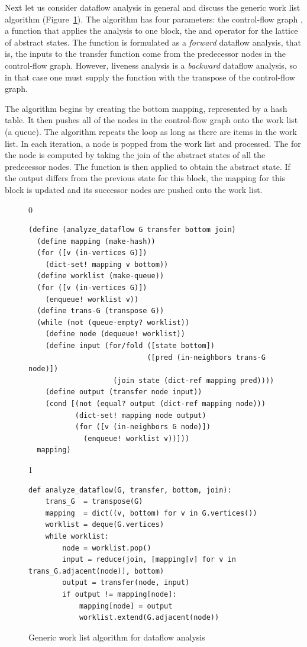 \documentclass[7x10,nocrop]{TimesAPriori_MIT}%
\def\racketEd{0}
\def\pythonEd{1}
\def\edition{1}
\begin{document}
Next let us consider dataflow analysis in general and discuss the
generic work list algorithm (Figure~\ref{fig:generic-dataflow}). 
%
The algorithm has four parameters: the control-flow graph , a
function  that applies the analysis to one block, the
 and  operator for the lattice of abstract
states. The  function is formulated as a
\emph{forward} dataflow analysis, that is, the inputs to the transfer
function come from the predecessor nodes in the control-flow
graph. However, liveness analysis is a \emph{backward} dataflow
analysis, so in that case one must supply the 
function with the transpose of the control-flow graph.

The algorithm begins by creating the bottom mapping, represented by a
hash table.  It then pushes all of the nodes in the control-flow graph
onto the work list (a queue). The algorithm repeats the 
loop as long as there are items in the work list. In each iteration, a
node is popped from the work list and processed. The  for
the node is computed by taking the join of the abstract states of all
the predecessor nodes. The  function is then applied to
obtain the  abstract state. If the output differs from
the previous state for this block, the mapping for this block is
updated and its successor nodes are pushed onto the work list.


\begin{figure}[tb]
{\if\edition\racketEd    
\begin{lstlisting}
(define (analyze_dataflow G transfer bottom join)
  (define mapping (make-hash))
  (for ([v (in-vertices G)])
    (dict-set! mapping v bottom))
  (define worklist (make-queue))
  (for ([v (in-vertices G)])
    (enqueue! worklist v))
  (define trans-G (transpose G))
  (while (not (queue-empty? worklist))
    (define node (dequeue! worklist)) 
    (define input (for/fold ([state bottom])
                            ([pred (in-neighbors trans-G node)])
                    (join state (dict-ref mapping pred))))
    (define output (transfer node input))
    (cond [(not (equal? output (dict-ref mapping node)))
           (dict-set! mapping node output)
           (for ([v (in-neighbors G node)])
             (enqueue! worklist v))]))
  mapping)
\end{lstlisting}
\fi}
{\if\edition\pythonEd
\begin{lstlisting}
def analyze_dataflow(G, transfer, bottom, join):
    trans_G  = transpose(G)
    mapping  = dict((v, bottom) for v in G.vertices())
    worklist = deque(G.vertices)
    while worklist:
        node = worklist.pop()
        input = reduce(join, [mapping[v] for v in trans_G.adjacent(node)], bottom)
        output = transfer(node, input)
        if output != mapping[node]:
            mapping[node] = output
            worklist.extend(G.adjacent(node))
\end{lstlisting}
\fi}
\caption{Generic work list algorithm for dataflow analysis}
  \label{fig:generic-dataflow}
\end{figure}
\end{document}
